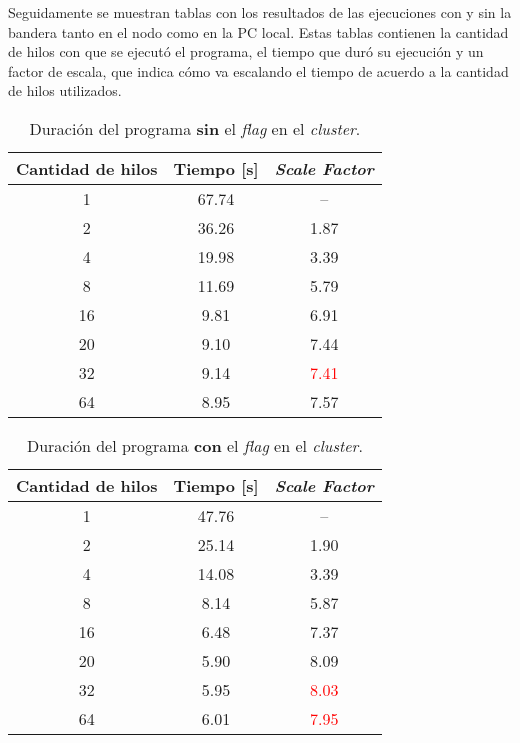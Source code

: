 \documentclass[12pt,a4paper]{article}
\begin{document}
Seguidamente se muestran tablas con los resultados de las ejecuciones con y sin
la bandera tanto en el nodo como en la PC local.
Estas tablas contienen la cantidad de hilos con que se ejecutó el programa, el
tiempo que duró su ejecución y un factor de escala, que indica cómo va
escalando el tiempo de acuerdo a la cantidad de hilos utilizados.

\begin{table}[H]
  \centering
  \begin{tabular}{|| c | c | c ||} \hline
    Cantidad de hilos & Tiempo {[}s{]} & \emph{Scale Factor} \\ \hline
    1                 & 67.74          & -- \\ \hline
    2                 & 36.26          & 1.87   \\ \hline
    4                 & 19.98          & 3.39   \\ \hline
    8                 & 11.69          & 5.79   \\ \hline
    16                & 9.81           & 6.91   \\ \hline
    20                & 9.10           & \textcolor{OliveGreen}{7.44} \\ \hline
    32                & 9.14           & \textcolor{Red}{7.41}   \\ \hline
    64                & 8.95           & 7.57   \\ \hline
  \end{tabular}
  \caption{Duración del programa \textbf{sin} el \emph{flag} en el \emph{cluster}.}
  \label{test1n}
\end{table}


\begin{table}[H]
  \centering
  \begin{tabular}{|| c | c | c ||} \hline
    Cantidad de hilos & Tiempo {[}s{]} & \emph{Scale Factor}\\ \hline
    1                 & 47.76          & -- \\ \hline
    2                 & 25.14          & 1.90   \\ \hline
    4                 & 14.08          & 3.39   \\ \hline
    8                 & 8.14           & 5.87   \\ \hline
    16                & 6.48           & 7.37   \\ \hline
    20                & 5.90           & \textcolor{OliveGreen}{8.09}   \\ \hline
    32                & 5.95           & \textcolor{Red}{8.03}   \\ \hline
    64                & 6.01           & \textcolor{Red}{7.95}   \\ \hline
  \end{tabular}
  \caption{Duración del programa \textbf{con} el \emph{flag} en el \emph{cluster}.}
  \label{test2n}
\end{table}
\end{document}
